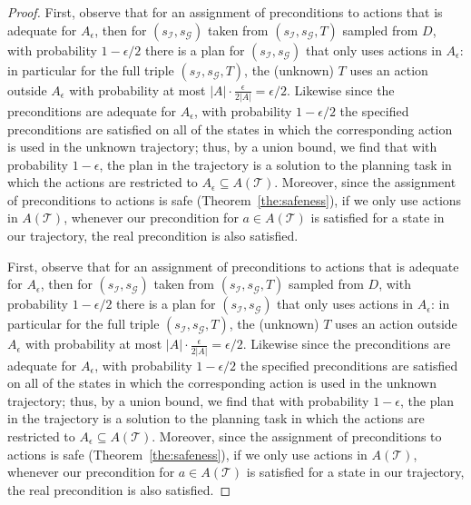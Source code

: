 \begin{proof}
	First, observe that for an assignment of preconditions to actions that is adequate for $A_\epsilon$, then for $(s_\mathcal{I},s_\mathcal{G})$ taken from $(s_\mathcal{I},s_\mathcal{G},T)$ sampled from $D$, with probability $1-\epsilon/2$ there is a plan for $(s_\mathcal{I},s_\mathcal{G})$ that only uses actions in $A_\epsilon$: in particular for the full triple $(s_\mathcal{I},s_\mathcal{G},T)$, the (unknown) $T$ uses an action outside $A_\epsilon$ with probability at most $|A|\cdot\frac{\epsilon}{2|A|}=\epsilon/2$.
	Likewise since the preconditions are adequate for $A_\epsilon$, with probability $1-\epsilon/2$ the specified preconditions are satisfied on all of the states in which the corresponding action is used in the unknown trajectory; thus, by a union bound, we find that with probability $1-\epsilon$, the plan in the trajectory is a solution to the planning task in which the actions are restricted to $A_\epsilon\subseteq A(\mathcal{T})$.
	Moreover, since the assignment of preconditions to actions is safe (Theorem~\ref{the:safeness}), if we only use actions in $A(\mathcal{T})$, whenever our precondition for $a\in A(\mathcal{T})$ is satisfied for a state in our trajectory, the real precondition is also satisfied.
	
	
	
	
	
	
	
	First, observe that for an assignment of preconditions to actions that is adequate for $A_\epsilon$, then for $(s_\mathcal{I},s_\mathcal{G})$ taken from $(s_\mathcal{I},s_\mathcal{G},T)$ sampled from $D$, with probability $1-\epsilon/2$ there is a plan for $(s_\mathcal{I},s_\mathcal{G})$ that only uses actions in $A_\epsilon$: in particular for the full triple $(s_\mathcal{I},s_\mathcal{G},T)$, the (unknown) $T$ uses an action outside $A_\epsilon$ with probability at most $|A|\cdot\frac{\epsilon}{2|A|}=\epsilon/2$.
	Likewise since the preconditions are adequate for $A_\epsilon$, with probability $1-\epsilon/2$ the specified preconditions are satisfied on all of the states in which the corresponding action is used in the unknown trajectory; thus, by a union bound, we find that with probability $1-\epsilon$, the plan in the trajectory is a solution to the planning task in which the actions are restricted to $A_\epsilon\subseteq A(\mathcal{T})$.
	Moreover, since the assignment of preconditions to actions is safe (Theorem~\ref{the:safeness}), if we only use actions in $A(\mathcal{T})$, whenever our precondition for $a\in A(\mathcal{T})$ is satisfied for a state in our trajectory, the real precondition is also satisfied. 
\end{proof}





